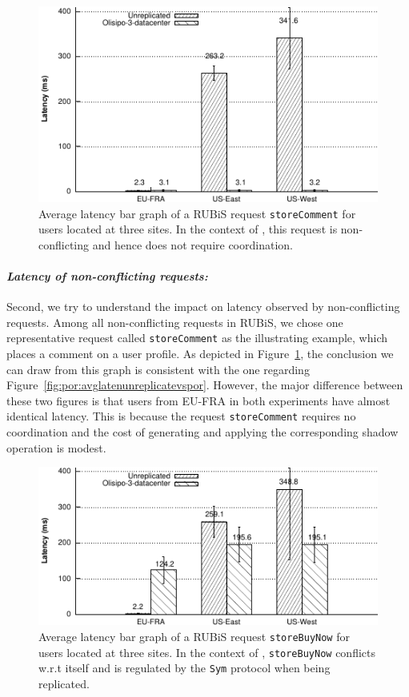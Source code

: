 \begin{figure}[t!]
  \centering
\includegraphics[width=0.85\columnwidth]{figures/por/eval/avg_latency_storecomment_unreplicated_vs_por.pdf}
  \caption{Average latency bar graph of a RUBiS request {\tt storeComment} for users located at three sites. In
  the context of \PRCN, this request is non-conflicting and hence does not require coordination.}
 \label{fig:por:avglatennfunreplicatevspor}
\end{figure}

\paragraph{{\em Latency of non-conflicting requests: }}Second, we try to understand the impact
on latency observed by non-conflicting requests. Among all non-conflicting requests in RUBiS,
we chose one representative request called {\tt storeComment} as the illustrating example, which places
a comment on a user profile. As depicted in Figure~\ref{fig:por:avglatennfunreplicatevspor}, the conclusion we can draw from this graph
is consistent with the one regarding Figure~\ref{fig:por:avglatenunreplicatevspor}. However, the major
difference between these two figures is that users from EU-FRA in both experiments have almost identical
latency. This is because the request {\tt storeComment} requires no coordination and the cost of 
generating and applying the corresponding shadow operation is modest.

\begin{figure}[t!]
  \centering
\includegraphics[width=0.85\columnwidth]{figures/por/eval/avg_latency_sym_storebuynow_unreplicated_vs_por.pdf}
  \caption{Average latency bar graph of a RUBiS request {\tt storeBuyNow} for 
  users located at three sites. In
  the context of \PRCN, {\tt storeBuyNow} conflicts w.r.t itself and is regulated by the {\tt Sym} protocol when being replicated.}
 \label{fig:por:avglatensymunreplicatevspor}
\end{figure}

